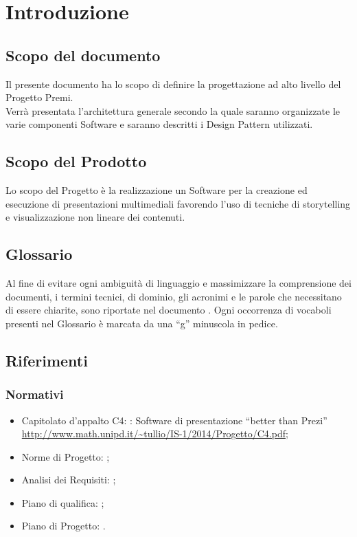 \section{Introduzione}
\subsection{Scopo del documento}
Il presente documento ha lo scopo di definire la progettazione ad alto livello del Progetto Premi.\\
Verrà presentata l'architettura generale secondo la quale saranno organizzate le varie componenti Software e saranno descritti i Design Pattern utilizzati.
\subsection{Scopo del Prodotto}
Lo scopo del Progetto è la realizzazione un Software per la creazione ed esecuzione di presentazioni multimediali favorendo l’uso di tecniche di storytelling e visualizzazione non lineare dei contenuti.
\subsection{Glossario}
Al fine di evitare ogni ambiguità di linguaggio e massimizzare la comprensione dei documenti, i termini tecnici, di dominio, gli acronimi e le parole che necessitano di essere chiarite, sono riportate nel documento \href{run:../../Esterni/\fGlossario}{\fEscapeGlossario}. Ogni occorrenza di vocaboli presenti nel Glossario è marcata da una “g” minuscola in pedice.
\subsection{Riferimenti}

\subsubsection{Normativi}
\begin{itemize}
\item Capitolato d’appalto C4: \premi: Software di presentazione “better than Prezi” \\
\url{http://www.math.unipd.it/~tullio/IS-1/2014/Progetto/C4.pdf};
\item Norme di Progetto: \href{run:../../Interni/\fNormeDiProgetto}{\fEscapeNormeDiProgetto};
\item Analisi dei Requisiti: \href{run:../../Interni/\fAnalisiDeiRequisiti}{\fEscapeAnalisiDeiRequisiti};
\item Piano di qualifica: \href{run:../../Interni/\fPianoDiQualifica}{\fEscapePianoDiQualifica};
\item Piano di Progetto: \href{run:../../Interni/\fPianoDiProgetto}{\fEscapePianoDiProgetto}.
\end{itemize}
